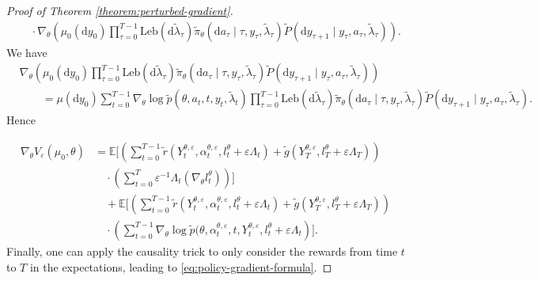 \documentclass[11pt]{article}
\numberwithin{equation}{section}
\theoremstyle{definition}
\theoremstyle{remark}
\def\eps{\varepsilon}
\def\d{{\mathrm{d}}}
\begin{document}
\begin{proof}[Proof of Theorem \ref{theorem:perturbed-gradient}]
\[\begin{aligned}
    & \quad \cdot \nabla_{\theta} \left(\mu_0(\d y_0) \prod_{\tau = 0}^{T - 1} \mathrm{Leb}(\d \tilde \lambda_\tau) \tilde \pi_{\theta} (\d a_\tau \mid \tau,y_\tau, \tilde \lambda_\tau) \tilde P (\d y_{\tau + 1} \mid y_\tau, a_\tau, \tilde{\lambda}_\tau) \right).
\end{aligned}
\]
We have
\[
\begin{aligned}
&\nabla_{\theta} \left(\mu_0(\d y_0) \prod_{\tau = 0}^{T - 1} \mathrm{Leb}(\d \tilde \lambda_\tau) \tilde \pi_{\theta} (\d a_\tau \mid \tau,y_\tau, \tilde \lambda_\tau) \tilde P (\d y_{\tau + 1} \mid y_\tau, a_\tau, \tilde{\lambda}_\tau) \right) \\
&\qquad= \mu(\d y_0) \sum_{t = 0}^{T - 1} \nabla_{\theta} \log \tilde p (\theta, a_t, t,y_t, \tilde \lambda_t) \prod_{\tau =0}^{T - 1} \mathrm{Leb}(\d \tilde \lambda_\tau) \tilde \pi_{\theta} (\d a_\tau \mid \tau,y_\tau, \tilde \lambda_\tau) \tilde P (\d y_{\tau + 1} \mid y_\tau, a_\tau, \tilde{\lambda}_\tau).
\end{aligned}
\]
Hence

\begin{equation*}
\begin{aligned}
\nabla_{\theta} V_\eps(\mu_0, \theta) &= \mathbb E \Bigg[\left( \sum_{t = 0}^{T - 1} \tilde r(Y^{\theta,\eps}_t,  \alpha_t^{\theta,\eps},  l_t^\theta + \eps \Lambda_t) + \tilde g(Y_T^{\theta, \eps}, l_T^\theta+ \eps \Lambda_T) \right) \\
& \quad \cdot \left( \sum_{t = 0}^{T} \eps^{-1} \Lambda_t \left(\nabla_{\theta} l_t^\theta\right)\right)\Bigg] \\
&\quad + \mathbb E \Bigg[\left( \sum_{t = 0}^{T - 1} \tilde r(Y^{\theta,\eps}_t, \alpha_t^{\theta,\eps}, l_t^\theta + \eps \Lambda_t) + \tilde g(Y_T^{\theta, \eps},  l_T^\theta + \eps \Lambda_T) \right)  \\
& \quad \cdot \left( \sum_{t = 0}^{T - 1} \nabla_\theta \log \tilde p(\theta, \alpha_t^{\theta,\eps}, t, Y_t^{\theta,\eps}, l_t^\theta + \eps \Lambda_t \right)  \Bigg].
\end{aligned}
\end{equation*}
Finally, one can apply the causality trick to only consider the rewards from time $t$ to $T$ in the expectations, leading to \eqref{eq:policy-gradient-formula}.
\end{proof}
\end{document}
